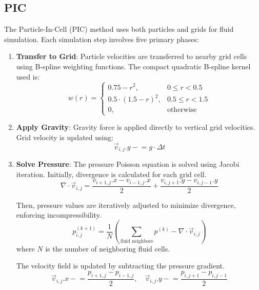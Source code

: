 \subsection{PIC}

The Particle-In-Cell (PIC) method uses both particles and grids for fluid simulation. Each simulation step involves five primary phases:

\begin{enumerate}
\item \textbf{Transfer to Grid}: Particle velocities are transferred to nearby grid cells using B-spline weighting functions.
The compact quadratic B-spline kernel used is:
\begin{equation}
w(r) =
\begin{cases}
0.75 - r^2, & 0 \le r < 0.5 \\
0.5 \cdot (1.5 - r)^2, & 0.5 \le r < 1.5 \\
0, & \text{otherwise}
\end{cases}
\end{equation}

\item \textbf{Apply Gravity}: Gravity force is applied directly to vertical grid velocities.
Grid velocity is updated using:
\begin{equation}
\vec{v}_{i,j}.y \mathrel{-}= g \cdot \Delta t
\end{equation}

\item \textbf{Solve Pressure}: The pressure Poisson equation is solved using Jacobi iteration. Initially, divergence is calculated for each grid cell. 
\begin{equation}
  \nabla \cdot \vec{v}_{i,j} = \frac{v_{i+1,j}.x - v_{i-1,j}.x}{2} + \frac{v_{i,j+1}.y - v_{i,j-1}.y}{2}
  \end{equation}

Then, pressure values are iteratively adjusted to minimize divergence, enforcing incompressibility.
\begin{equation}
  p_{i,j}^{(k+1)} = \frac{1}{N} \left( \sum_{\text{fluid neighbors}} p^{(k)} - \nabla \cdot \vec{v}_{i,j} \right)
  \end{equation}
  where \( N \) is the number of neighboring fluid cells.

The velocity field is updated by subtracting the pressure gradient.
\begin{equation}
  \vec{v}_{i,j}.x \mathrel{-}= \frac{p_{i+1,j} - p_{i-1,j}}{2}, \quad
  \vec{v}_{i,j}.y \mathrel{-}= \frac{p_{i,j+1} - p_{i,j-1}}{2}
  \end{equation}


\end{enumerate}
